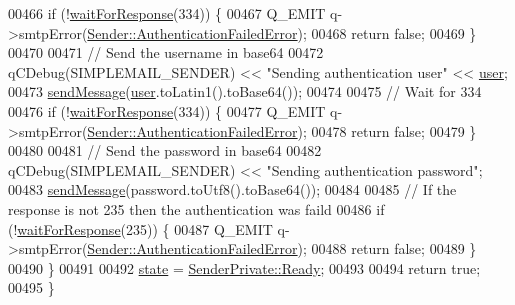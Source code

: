 \begin{DoxyCode}
00466         \textcolor{keywordflow}{if} (!\hyperlink{class_simple_mail_1_1_sender_private_af8ba23dc3e1201d303ad1d923235c71c}{waitForResponse}(334)) \{
00467             Q\_EMIT q->smtpError(\hyperlink{class_simple_mail_1_1_sender_a276560e9e955ab6be451338c3776bf49a2d402af356c1513cf08749bf7a204703}{Sender::AuthenticationFailedError});
00468             \textcolor{keywordflow}{return} \textcolor{keyword}{false};
00469         \}
00470 
00471         \textcolor{comment}{// Send the username in base64}
00472         qCDebug(SIMPLEMAIL\_SENDER) << \textcolor{stringliteral}{"Sending authentication user"} << \hyperlink{class_simple_mail_1_1_sender_private_ac3efab988a41e60a0a56c29a1d5b04ed}{user};
00473         \hyperlink{class_simple_mail_1_1_sender_private_a01805bb24291bf6cad3a656a16d0bb25}{sendMessage}(\hyperlink{class_simple_mail_1_1_sender_private_ac3efab988a41e60a0a56c29a1d5b04ed}{user}.toLatin1().toBase64());
00474 
00475         \textcolor{comment}{// Wait for 334}
00476         \textcolor{keywordflow}{if} (!\hyperlink{class_simple_mail_1_1_sender_private_af8ba23dc3e1201d303ad1d923235c71c}{waitForResponse}(334)) \{
00477             Q\_EMIT q->smtpError(\hyperlink{class_simple_mail_1_1_sender_a276560e9e955ab6be451338c3776bf49a2d402af356c1513cf08749bf7a204703}{Sender::AuthenticationFailedError});
00478             \textcolor{keywordflow}{return} \textcolor{keyword}{false};
00479         \}
00480 
00481         \textcolor{comment}{// Send the password in base64}
00482         qCDebug(SIMPLEMAIL\_SENDER) << \textcolor{stringliteral}{"Sending authentication password"};
00483         \hyperlink{class_simple_mail_1_1_sender_private_a01805bb24291bf6cad3a656a16d0bb25}{sendMessage}(password.toUtf8().toBase64());
00484 
00485         \textcolor{comment}{// If the response is not 235 then the authentication was faild}
00486         \textcolor{keywordflow}{if} (!\hyperlink{class_simple_mail_1_1_sender_private_af8ba23dc3e1201d303ad1d923235c71c}{waitForResponse}(235)) \{
00487             Q\_EMIT q->smtpError(\hyperlink{class_simple_mail_1_1_sender_a276560e9e955ab6be451338c3776bf49a2d402af356c1513cf08749bf7a204703}{Sender::AuthenticationFailedError});
00488             \textcolor{keywordflow}{return} \textcolor{keyword}{false};
00489         \}
00490     \}
00491 
00492     \hyperlink{class_simple_mail_1_1_sender_private_af73e80fdae8024d12714f6f3a1cc1e23}{state} = \hyperlink{class_simple_mail_1_1_sender_private_ae09befddf0fae8e8f2ea153ead2b8b0aac1f1f30c7c54375f9bed9a95bd082416}{SenderPrivate::Ready};
00493 
00494     \textcolor{keywordflow}{return} \textcolor{keyword}{true};
00495 \}
\end{DoxyCode}
\mbox{\label{class_simple_mail_1_1_sender_private_ab3a7663dd6945ce2ba074d37cfc4e4ec}} 
